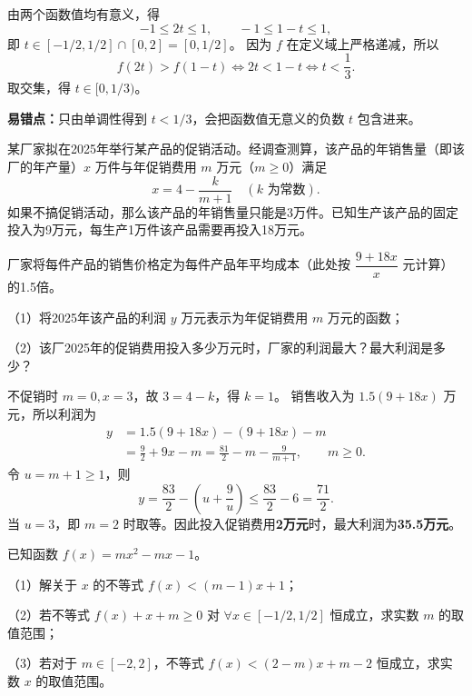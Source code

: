 \begin{frame}
由两个函数值均有意义，得
\[-1\le2t\le1,\qquad -1\le1-t\le1,\]
即 $t\in[-1/2,1/2]\cap[0,2]=[0,1/2]$。
\pause
因为 $f$ 在定义域上严格递减，所以
\[f(2t)>f(1-t)\iff2t<1-t\iff t<\frac13.\]
取交集，得 $\boxed{t\in[0,1/3)}$。
\par\vspace{3mm}
\textbf{易错点：}只由单调性得到 $t<1/3$，会把函数值无意义的负数 $t$ 包含进来。
\end{frame}

\begin{frame}
某厂家拟在2025年举行某产品的促销活动。经调查测算，该产品的年销售量（即该厂的年产量）$x$ 万件与年促销费用 $m$ 万元（$m\ge0$）满足
\[x=4-\frac{k}{m+1}\quad(k\text{ 为常数}).\]
如果不搞促销活动，那么该产品的年销售量只能是3万件。已知生产该产品的固定投入为9万元，每生产1万件该产品需要再投入18万元。
\par\vspace{2mm}
厂家将每件产品的销售价格定为每件产品年平均成本（此处按 $\dfrac{9+18x}{x}$ 元计算）的1.5倍。
\par\vspace{2mm}
（1）将2025年该产品的利润 $y$ 万元表示为年促销费用 $m$ 万元的函数；\par
（2）该厂2025年的促销费用投入多少万元时，厂家的利润最大？最大利润是多少？
\end{frame}

\begin{frame}
不促销时 $m=0,x=3$，故 $3=4-k$，得 $k=1$。
销售收入为 $1.5(9+18x)$ 万元，所以利润为
\begin{align*}
y&=1.5(9+18x)-(9+18x)-m\\
&=\frac92+9x-m
=\frac{81}{2}-m-\frac9{m+1},\qquad m\ge0.
\end{align*}
\pause
令 $u=m+1\ge1$，则
\[y=\frac{83}{2}-\left(u+\frac9u\right)\le\frac{83}{2}-6=\frac{71}{2}.\]
当 $u=3$，即 $m=2$ 时取等。因此投入促销费用\textbf{2万元}时，最大利润为\textbf{35.5万元}。
\end{frame}

\begin{frame}
已知函数 $f(x)=mx^2-mx-1$。
\par\vspace{4mm}
（1）解关于 $x$ 的不等式 $f(x)<(m-1)x+1$；\par\vspace{3mm}
（2）若不等式 $f(x)+x+m\ge0$ 对 $\forall x\in[-1/2,1/2]$ 恒成立，求实数 $m$ 的取值范围；\par\vspace{3mm}
（3）若对于 $m\in[-2,2]$，不等式 $f(x)<(2-m)x+m-2$ 恒成立，求实数 $x$ 的取值范围。
\end{frame}

